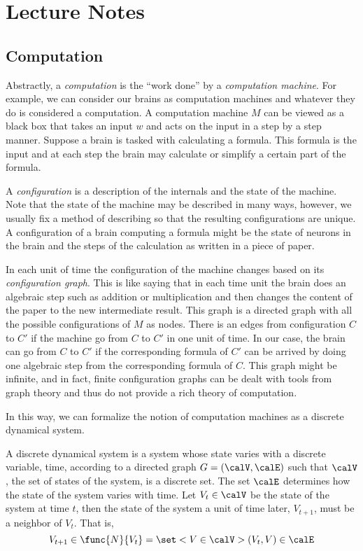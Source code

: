\chapter{Lecture Notes}
\section{Computation}
Abstractly, a \textit{computation} is the ``work done'' by a \textit{computation machine}. For example, we can consider our brains as computation machines and whatever they do is considered a computation. A computation machine \(M\) can be viewed as a black box that takes an input \(w\) and acts on the input in a step by a step manner. Suppose a brain is tasked with calculating a formula. This formula is the input and at each step the brain may calculate or simplify a certain part of the formula. 

A \textit{configuration} is a description of the internals and the state of the machine. Note that the state of the machine may be described in many ways, however, we usually fix a method of describing so that the resulting configurations are unique. A configuration of a brain computing a formula might be the state of neurons in the brain and the steps of the calculation as written in a piece of paper.

In each unit of time the configuration of the machine changes based on its \textit{configuration graph}. This is like saying that in each time unit the brain does an algebraic step such as addition or multiplication and then changes the content of the paper to the new intermediate result. This graph is a directed graph with all the possible configurations of \(M\) as nodes. There is an edges from configuration \(C\) to \(C'\) if the machine go from \(C\) to \(C'\) in one unit of time. In our case, the brain can go from \(C\) to \(C'\) if the corresponding formula of \(C'\) can be arrived by doing one algebraic step from the corresponding formula of \(C\). This graph might be infinite, and in fact, finite configuration graphs can be dealt with tools from graph theory and thus do not provide a rich theory of computation.

In this way, we can formalize the notion of computation machines as a discrete dynamical system. 

\begin{definition}
    A discrete dynamical system is a system whose state varies with a discrete variable, time, according to a directed graph \(G = (\calV,\calE)\) such that \(\calV\), the set of states of the system, is a discrete set. The set \(\calE\) determines how the state of the system varies with time. Let \(V_t \in \calV\) be the state of the system at time \(t\), then the state of the system a unit of time later, \(V_{t+1}\), must be a neighbor of \(V_t\). That is,
    \begin{equation*}
        V_{t+1} \in \func{N}{V_t} = \set<V \in \calV>{(V_t, V) \in \calE}
    \end{equation*}
\end{definition}

